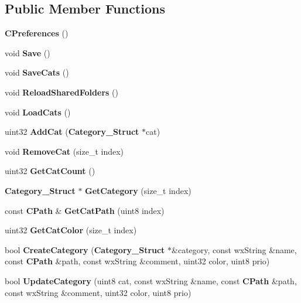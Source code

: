 \subsection*{Public Member Functions}
\begin{DoxyCompactItemize}
\item 
{\bf CPreferences} ()\label{classCPreferences_ac27affe5edeef4cbdf146cb796aa88ce}

\item 
void {\bfseries Save} ()\label{classCPreferences_a9610efa3f898fe8f7199c23e1bcc3088}

\item 
void {\bfseries SaveCats} ()\label{classCPreferences_a25473909263352807da54647e136fc2f}

\item 
void {\bfseries ReloadSharedFolders} ()\label{classCPreferences_a984a1ae6548c355feca25a064d5b2c00}

\item 
void {\bfseries LoadCats} ()\label{classCPreferences_a4e484659d4e0e9f6958b75b685b75b8e}

\item 
uint32 {\bfseries AddCat} ({\bf Category\_\-Struct} $\ast$cat)\label{classCPreferences_ae380943fd5b5cada7f66bee76ba251fe}

\item 
void {\bfseries RemoveCat} (size\_\-t index)\label{classCPreferences_acbe48fc276a338a5f9dc66f15dd620be}

\item 
uint32 {\bfseries GetCatCount} ()\label{classCPreferences_ad8f3357001365da80f28f00fd5bb2b25}

\item 
{\bf Category\_\-Struct} $\ast$ {\bfseries GetCategory} (size\_\-t index)\label{classCPreferences_a25a2d4ccab11066b55715187516bf628}

\item 
const {\bf CPath} \& {\bfseries GetCatPath} (uint8 index)\label{classCPreferences_adb73e8798de2200a2a915807753bac79}

\item 
uint32 {\bfseries GetCatColor} (size\_\-t index)\label{classCPreferences_ab3b2e4c32d64aaa600cb3ee61a8cfd51}

\item 
bool {\bfseries CreateCategory} ({\bf Category\_\-Struct} $\ast$\&category, const wxString \&name, const {\bf CPath} \&path, const wxString \&comment, uint32 color, uint8 prio)\label{classCPreferences_a05f83c31ed6aab93241363e24736eb68}

\item 
bool {\bfseries UpdateCategory} (uint8 cat, const wxString \&name, const {\bf CPath} \&path, const wxString \&comment, uint32 color, uint8 prio)\label{classCPreferences_aa391e44d95a871d8d6a1e8faf6367a5f}

\end{DoxyCompactItemize}
